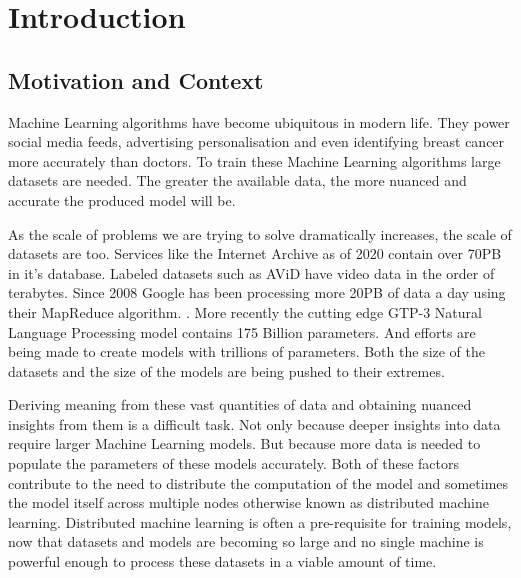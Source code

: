 
\section{Introduction}

\subsection{Motivation and Context}

Machine Learning algorithms have become ubiquitous in modern life. They power
social media feeds, advertising personalisation and even identifying breast
cancer more accurately than doctors. \cite{Mammograms2020} To train these
Machine Learning algorithms large datasets are needed. The greater the available
data, the more nuanced and accurate the produced model will be.
\par

As the scale of problems we are trying to solve dramatically increases, the
scale of datasets are too. Services like the Internet Archive as of 2020 contain
over 70PB in it's database. Labeled datasets such as AViD have video data in the
order of terabytes. \cite{piergiovanni2020avid} Since 2008 Google has been
processing more 20PB of data a day using their MapReduce algorithm.
\cite{googlemapreduce2008}. More recently the cutting edge GTP-3 Natural
Language Processing model contains 175 Billion parameters.
\cite{fewshowlearners2020gpt} And efforts are being made to create models with
trillions of parameters. \cite{rajbhandari2020zero} Both the size of the
datasets and the size of the models are being pushed to their extremes.
\par

Deriving meaning from these vast quantities of data and obtaining nuanced
insights from them is a difficult task. Not only because deeper insights into
data require larger Machine Learning models. But because more data is needed to
populate the parameters of these models accurately. Both of these factors
contribute to the need to distribute the computation of the model and sometimes
the model itself across multiple nodes otherwise known as distributed machine
learning. Distributed machine learning is often a pre-requisite for training
models, now that datasets and models are becoming so large and no single machine
is powerful enough to process these datasets in a viable amount of time.
\cite{LI2014ParameterServers}
\par

